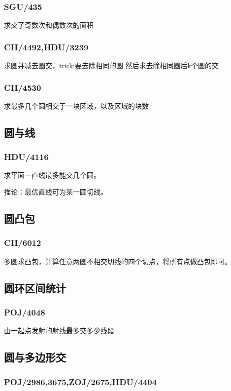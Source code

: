 \subsubsection{SGU/435}
求交了奇数次和偶数次的面积

\subsubsection{CII/4492,HDU/3239}
求圆并减去圆交，trick:要去除相同的圆
然后求去除相同圆后k个圆的交

\subsubsection{CII/4530}
求最多几个圆相交于一块区域，以及区域的块数


\subsection{圆与线}
\subsubsection{HDU/4116}
求平面一直线最多能交几个圆。

推论：最优直线可为某一圆切线。


\subsection{圆凸包}
\subsubsection{CII/6012}
多圆求凸包，计算任意两圆不相交切线的四个切点，将所有点做凸包即可。


\subsection{圆环区间统计}
\subsubsection{POJ/4048}
由一起点发射的射线最多交多少线段


\subsection{圆与多边形交}
\subsubsection{POJ/2986,3675,ZOJ/2675,HDU/4404}

